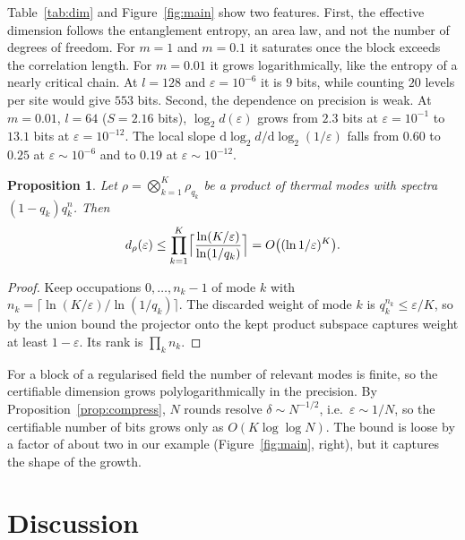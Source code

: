 \documentclass[11pt]{article}
\newtheorem{proposition}{Proposition}[section]
\theoremstyle{definition}\newtheorem{definition}{Definition}[section]
\theoremstyle{remark}\newtheorem*{remark}{Remark}
\newcommand{\dd}{\mathrm{d}}
\begin{document}
Table~\ref{tab:dim} and Figure~\ref{fig:main} show two features. First, the effective dimension follows the entanglement
entropy, an area law, and not the number of degrees of freedom. For $m=1$ and $m=0.1$ it saturates once the block exceeds the
correlation length. For $m=0.01$ it grows logarithmically, like the entropy of a nearly critical chain. At $l=128$ and
$\varepsilon=10^{-6}$ it is $9$ bits, while counting $20$ levels per site would give $553$ bits. Second, the dependence on precision is
weak. At $m=0.01$, $l=64$ ($S=2.16$ bits), $\log_2d(\varepsilon)$ grows from $2.3$ bits at $\varepsilon=10^{-1}$ to $13.1$ bits at $\varepsilon=10^{-12}$. The local slope
$\dd\log_2d/\dd\log_2(1/\varepsilon)$ falls from $0.60$ to $0.25$ at $\varepsilon\sim10^{-6}$ and to $0.19$ at $\varepsilon\sim10^{-12}$.

\begin{proposition}
\label{prop:product}
Let $\rho=\bigotimes_{k=1}^K\rho_{q_k}$ be a product of thermal modes with spectra $(1-q_k)q_k^n$. Then
\begin{equation}
d_\rho(\varepsilon)\le\prod_{k=1}^K\Bigl\lceil\frac{\ln(K/\varepsilon)}{\ln(1/q_k)}\Bigr\rceil=O\bigl((\ln1/\varepsilon)^K\bigr).
\end{equation}
\end{proposition}

\begin{proof}
Keep occupations $0,\dots,n_k-1$ of mode $k$ with $n_k=\lceil\ln(K/\varepsilon)/\ln(1/q_k)\rceil$. The discarded weight of mode $k$ is $q_k^{n_k}\le\varepsilon/K$,
so by the union bound the projector onto the kept product subspace captures weight at least $1-\varepsilon$. Its rank is $\prod_kn_k$.
\end{proof}

For a block of a regularised field the number of relevant modes is finite, so the certifiable dimension grows
polylogarithmically in the precision. By Proposition~\ref{prop:compress}, $N$ rounds resolve $\delta\sim N^{-1/2}$, i.e.\ $\varepsilon\sim1/N$, so the
certifiable number of bits grows only as $O(K\log\log N)$. The bound is loose by a factor of about two in our example
(Figure~\ref{fig:main}, right), but it captures the shape of the growth.

\section{Discussion}
\label{sec:discussion}
\end{document}
